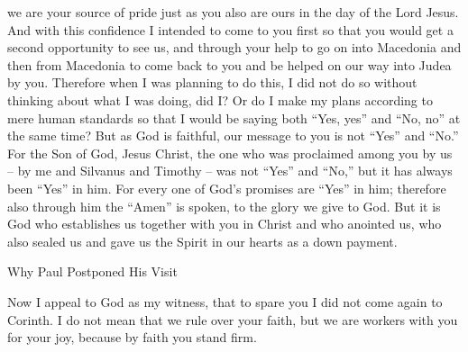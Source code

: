 {we
are your
source of pride
just as
you
also
are ours
in
the day
of the Lord
Jesus.
And
with this
confidence
I intended
to come
to
you
first so that
you would get
a second
opportunity to see us,
and
through
your
help to go on
into
Macedonia
and
then
from
Macedonia
to come back
to
you
and
be helped on
our way
into
Judea
by
you.
Therefore
when
I was planning to do
this,
I did not do so without thinking
about what I
was doing,
did I? Or
do I make my plans
according to
mere human
standards
so that
I would be saying both “Yes,
yes”
and
“No,
no” at the same time?
But
as God
is faithful,
our
message
to
you
is
not
“Yes”
and
“No.”
For
the Son
of God,
Jesus
Christ,
the one who was proclaimed
among
you
by
us
– by
me
and
Silvanus
and
Timothy
– was
not
“Yes”
and
“No,”
but
it has always been
“Yes”
in
him.
For
every one
of God’s
promises
are “Yes”
in
him;
therefore
also
through
him
the “Amen”
is spoken, to
the glory
we
give to God.
But
it is God
who establishes
us
together with
you
in
Christ
and
who anointed
us,
who also
sealed
us
and
gave
us the Spirit
in
our
hearts
as a down payment.
\par }{\SH Why Paul Postponed His Visit
\par }{\PP {}Now I
appeal
to God
as
my witness,
that
to spare
you
I did
not
come again
to
Corinth.
I do not
mean that
we rule over
your
faith,
but
we are
workers
with you for your
joy,
because
by faith
you stand firm.

}
